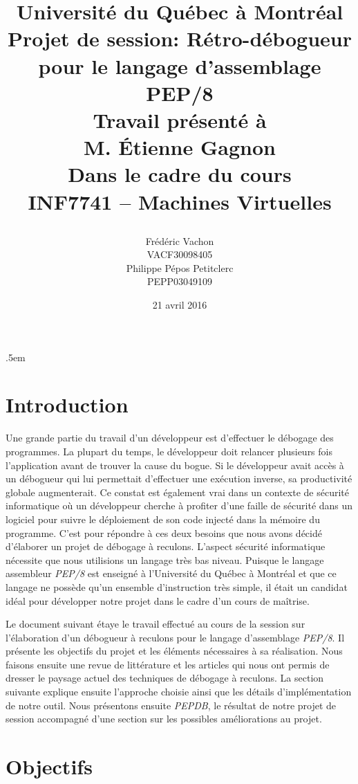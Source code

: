 \documentclass{article}
\title{ 
	\Large{Université du Québec à Montréal}\\ 
	\vspace{3cm} 
	\huge{Projet de session: Rétro-débogueur pour le langage d'assemblage PEP/8}\\ 
	\vspace{3cm} 
	\Large{Travail présenté à \\M. Étienne Gagnon} \\ 
	\vspace{1.5cm} 
	\Large{Dans le cadre du cours \\INF7741 – Machines Virtuelles} \\ 
	\vspace{1cm} 
	\author{Frédéric Vachon\\VACF30098405\\Philippe Pépos Petitclerc\\PEPP03049109} 
	\date{\vspace{0.5cm} 21 avril 2016} 
	\vfill 
}
\begin{document}
 
\maketitle 

\tableofcontents

\thispagestyle{empty} 
\clearpage 

\openup .5em

\section{Introduction}\label{introduction}

Une grande partie du travail d'un développeur est d'effectuer le
débogage des programmes. La plupart du temps, le développeur doit
relancer plusieurs fois l'application avant de trouver la cause du
bogue. Si le développeur avait accès à un débogueur qui lui permettait
d'effectuer une exécution inverse, sa productivité globale augmenterait.
Ce constat est également vrai dans un contexte de sécurité informatique
où un développeur cherche à profiter d'une faille de sécurité dans un
logiciel pour suivre le déploiement de son code injecté dans la mémoire
du programme. C'est pour répondre à ces deux besoins que nous avons
décidé d'élaborer un projet de débogage à reculons. L'aspect sécurité
informatique nécessite que nous utilisions un langage très bas niveau.
Puisque le langage assembleur \emph{PEP/8} est enseigné à l'Université
du Québec à Montréal et que ce langage ne possède qu'un ensemble
d'instruction très simple, il était un candidat idéal pour développer
notre projet dans le cadre d'un cours de maîtrise.

Le document suivant étaye le travail effectué au cours de la session sur
l'élaboration d'un débogueur à reculons pour le langage d'assemblage
\emph{PEP/8}. Il présente les objectifs du projet et les éléments
nécessaires à sa réalisation. Nous faisons ensuite une revue de
littérature et les articles qui nous ont permis de dresser le paysage
actuel des techniques de débogage à reculons. La section suivante
explique ensuite l'approche choisie ainsi que les détails
d'implémentation de notre outil. Nous présentons ensuite \emph{PEPDB},
le résultat de notre projet de session accompagné d'une section sur les
possibles améliorations au projet.

\section{Objectifs}\label{objectifs}
\end{document}
